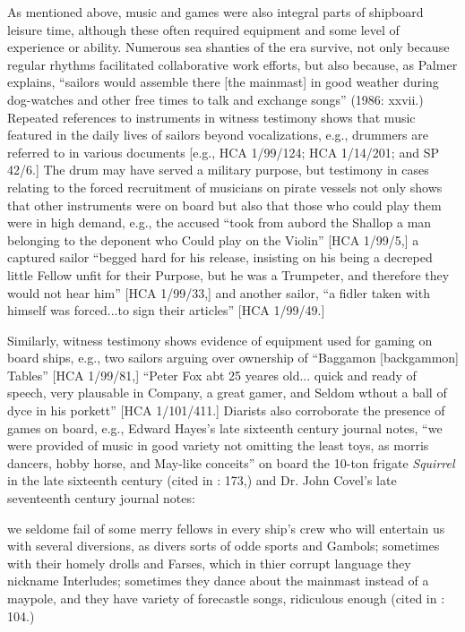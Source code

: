 As mentioned above, music and games were also integral parts of shipboard leisure time, although these often required equipment and some level of experience or ability. Numerous sea shanties of the era survive, not only because regular rhythms facilitated collaborative work efforts, but also because, as Palmer explains, “sailors would assemble there [the mainmast] in good weather during dog-watches and other free times to talk and exchange songs” (1986: xxvii.) Repeated references to instruments in witness testimony shows that music featured in the daily lives of sailors beyond vocalizations, e.g., drummers are referred to in various documents [e.g., HCA 1/99/124; HCA 1/14/201; and SP 42/6.] The drum may have served a military purpose, but testimony in cases relating to the forced recruitment of musicians on pirate vessels not only  shows that other instruments were on board but also that those who could play them were in high demand, e.g., the accused “took from aubord the Shallop a man belonging to the deponent who Could play on the Violin” [HCA 1/99/5,] a captured sailor “begged hard for his release, insisting on his being a decreped little Fellow unfit for their Purpose, but he was a Trumpeter, and therefore they would not hear him” [HCA 1/99/33,] and another sailor, “a fidler taken with himself was forced...to sign their articles” [HCA 1/99/49.] 

Similarly, witness testimony shows evidence of equipment used for gaming on board ships, e.g., two sailors arguing over ownership of “Baggamon [backgammon] Tables” [HCA 1/99/81,] “Peter Fox abt 25 yeares old... quick and ready of speech, very plausable in Company, a great gamer, and Seldom wthout a ball of dyce in his porkett” [HCA 1/101/411.] Diarists also corroborate the presence of games on board, e.g., Edward Hayes’s late sixteenth century journal notes, “we were provided of music in good variety not omitting the least toys, as morris dancers, hobby horse, and May-like conceits” on board the 10-ton frigate \textit{Squirrel} in the late sixteenth century (cited in \citealt{Bicheno2012}: 173,) and Dr. John Covel’s late seventeenth century journal notes:

we seldome fail of some merry fellows in every ship’s crew who will entertain us with several diversions, as divers sorts of odde sports and Gambols; sometimes with their homely drolls and Farses, which in thier corrupt language they nickname Interludes; sometimes they dance about the mainmast instead of a maypole, and they have variety of forecastle songs, ridiculous enough (cited in \citealt{Palmer1986}: 104.)

